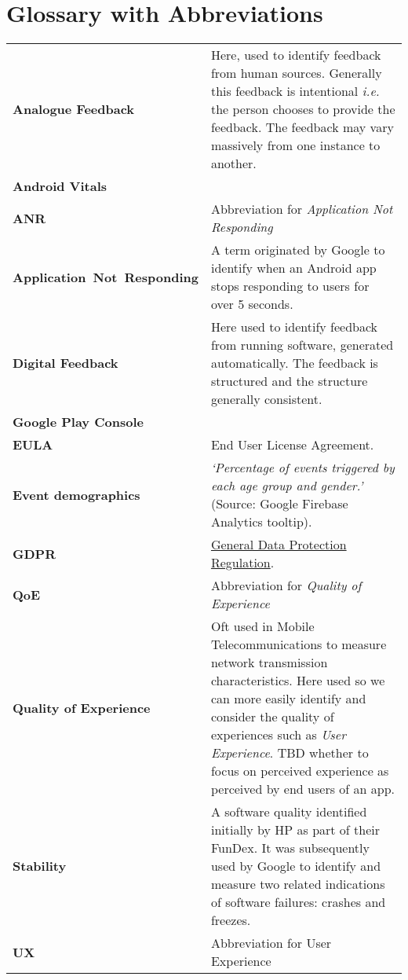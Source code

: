 \section{Glossary with Abbreviations}
\begin{tabular}{@{}>{\bfseries}p{5.3cm}p{9.2cm}@{}}

Analogue Feedback & Here, used to identify feedback from human sources. Generally this feedback is intentional \emph{i.e.} the person chooses to provide the feedback. The feedback may vary massively from one instance to another.\\

Android Vitals & \\

ANR & Abbreviation for \emph{Application Not Responding} \\

Application~\mbox{Not Responding} & A term originated by Google to identify when an Android app stops responding to users for over 5 seconds. \\

Digital Feedback & Here used to identify feedback from running software, generated automatically. The feedback is structured and the structure generally consistent.\\
Google Play Console & \\

EULA &End User License Agreement. \\

Event demographics & \emph{`Percentage of events triggered by each age group and gender.'} (Source: Google Firebase Analytics tooltip).\\

GDPR &\href{https://gdpr-info.eu/}{General Data Protection Regulation}. \\ 

QoE & Abbreviation for \emph{Quality of Experience} \\

Quality of Experience & Oft used in Mobile Telecommunications to measure network transmission characteristics. Here used so we can more easily identify and consider the quality of experiences such as \emph{User Experience}. TBD whether to focus on perceived experience as perceived by end users of an app.\\

Stability &A software quality identified initially by HP as part of their FunDex. It was subsequently used by Google to identify and measure two related indications of software failures: crashes and freezes. \\ %

UX & Abbreviation for User Experience \\
\end{tabular}

